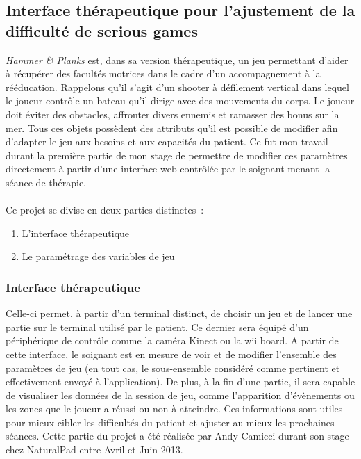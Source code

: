 \subsection{Interface thérapeutique pour l'ajustement de la difficulté de serious games}	
\emph{Hammer \& Planks} est, dans sa version thérapeutique, un jeu permettant d'aider à récupérer des facultés motrices dans le cadre d'un accompagnement à la rééducation. Rappelons qu'il s'agit d'un shooter à défilement vertical dans lequel le joueur contrôle un bateau qu'il dirige avec des mouvements du corps. Le joueur doit éviter des obstacles, affronter divers ennemis et ramasser des bonus sur la mer. Tous ces objets possèdent des attributs qu'il est possible de modifier afin d'adapter le jeu aux besoins et aux capacités du patient. Ce fut mon travail durant la première partie de mon stage de permettre de modifier ces paramètres directement à partir d'une interface web contrôlée par le soignant menant la séance de thérapie.
\paragraph{}
Ce projet se divise en deux parties distinctes~:
\begin{enumerate}
	\item L'interface thérapeutique
	\item Le paramétrage des variables de jeu
\end{enumerate}

	\subsubsection*{Interface thérapeutique}
Celle-ci permet, à partir d'un terminal distinct, de choisir un jeu et de lancer une partie sur le terminal utilisé par le patient. Ce dernier sera équipé d'un périphérique de contrôle comme la caméra Kinect ou la wii board. A partir de cette interface, le soignant est en mesure de voir et de modifier l'ensemble des paramètres de jeu (en tout cas, le sous-ensemble considéré comme pertinent et effectivement envoyé à l'application). De plus, à la fin d'une partie, il sera capable de visualiser les données de la session de jeu, comme l'apparition d'évènements ou les zones que le joueur a réussi ou non à atteindre. Ces informations sont utiles pour mieux cibler les difficultés du patient et ajuster au mieux les prochaines séances. Cette partie du projet a été réalisée par Andy Camicci durant son stage chez NaturalPad entre Avril et Juin 2013.

